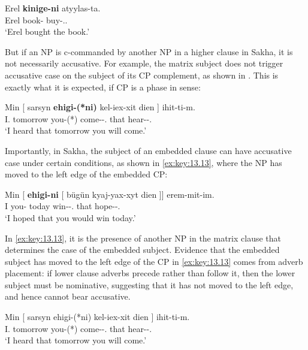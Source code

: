 \documentclass[output=paper]{langsci/langscibook}
\begin{document}
\ea%
    \label{ex:key:13.11} \parencite[112]{Baker2015}
    \sn
    \gll  Erel  \textbf{kinige-ni}  atyylas-ta.\\
          Erel book-\Acc{}  buy-\Pst{}.\Tsg.\Sbj{}\\
    \glt  ‘Erel bought the book.’
\z

But if an NP is c-commanded by another NP in a higher clause in Sakha, it is
not necessarily accusative. For example, the matrix subject does not trigger
accusative case on the subject of its CP complement, as shown in
. This is exactly what it is expected, if CP is a
phase in
 sense:

\ea%
    \label{ex:key:13.12} \parencite[113]{Baker2015}
    \sn
    \gll  Min    [ sarsyn \textbf{ehigi-(*ni)}  kel-iex-xit dien ] ihit-ti-m.\\
          I.\Nom{} {} tomorrow you-(*\Acc)  come-\Fut{}-\Spl.\Sbj{}  that {} hear-\Pst{}-\Fsg.\Sbj{}\\
    \glt  ‘I heard that tomorrow you will come.’
\z

Importantly, in Sakha, the subject of an embedded clause can have accusative
case under certain conditions, as shown in \eqref{ex:key:13.13}, where the NP has
moved to the left edge of the embedded CP:

\ea%
    \label{ex:key:13.13} \parencite[114]{Baker2015}
    \sn
    \gll  Min [ \textbf{ehigi-ni} [ bügün kyaj-yax-xyt dien ]]  erem-mit-im.\\
    I {} you-\Acc{} {} today win-\Fut{}-\Tpl.\Sbj{}  that {} hope-\Ptcp{}-\Fsg.\Sbj{}\\
    \glt  ‘I hoped that you would win today.’
\z

In \eqref{ex:key:13.13}, it is the presence of another NP in the matrix clause that
determines the case of the embedded subject. Evidence that the embedded subject
has moved to the left edge of the CP in \eqref{ex:key:13.13} comes from adverb
placement: if lower clause adverbs precede rather than follow it, then the
lower subject must be nominative, suggesting that it has not moved to the left
edge, and hence cannot bear accusative.\newpage

\ea%
    \label{ex:key:13.14} \parencite[115]{Baker2015}
    \sn
    \gll    Min [ sarsyn ehigi-(*ni)  kel-iex-xit dien ]  ihit-ti-m.\\
    I.\Nom{} {} tomorrow you-(*\Acc)  come-\Fut{}-\Spl.\Sbj{} that {} hear-\Pst{}-\Fsg.\Sbj{}\\
    \glt    ‘I heard that tomorrow you will come.’
\z
\end{document}
